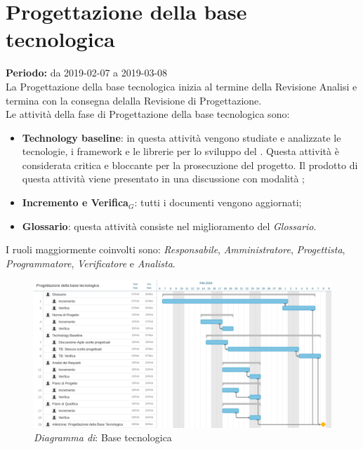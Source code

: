 \section{Progettazione della base tecnologica}
\textbf{Periodo:} da 2019-02-07 a 2019-03-08\\
La Progettazione della base tecnologica inizia al termine della Revisione Analisi e termina con la consegna delalla Revisione di Progettazione.\\
Le attività della fase di Progettazione della base tecnologica sono:
\begin{itemize}
    \item\textbf{Technology baseline}: in questa attività vengono studiate e analizzate le tecnologie, i framework e le librerie per lo sviluppo del . Questa attività è considerata critica e bloccante per la prosecuzione del progetto.
    Il prodotto di questa attività viene presentato in una discussione con modalità ;
    \item \textbf{Incremento e Verifica$_{G}$}: tutti i documenti vengono aggiornati;
    \item \textbf{Glossario}: questa attività consiste nel miglioramento del \textit{Glossario}.
\end{itemize}
I ruoli maggiormente coinvolti sono: \textit{Responsabile}, \textit{Amministratore}, \textit{Progettista}, \textit{Programmatore}, \textit{Verificatore} e \textit{Analista}.
\begin{figure} [h]
    \centering
    \includegraphics[scale=0.13]{./images/base_tecnologica.jpg}
    \caption{\textit{Diagramma di}: Base tecnologica }\label{}
\end{figure}
\newpage
